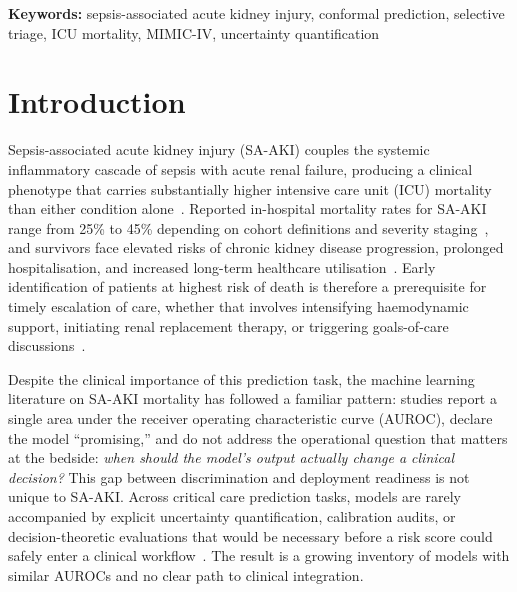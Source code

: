 \documentclass[11pt]{article}
\begin{document}
\medskip
\noindent\textbf{Keywords:}
sepsis-associated acute kidney injury, conformal prediction, selective triage,
ICU mortality, MIMIC-IV, uncertainty quantification


\section{Introduction}\label{sec:introduction}

Sepsis-associated acute kidney injury (SA-AKI) couples the systemic inflammatory
cascade of sepsis with acute renal failure, producing a clinical phenotype that
carries substantially higher intensive care unit (ICU) mortality than either
condition alone~\citep{Poston2019,Kellum2021}.  Reported in-hospital mortality
rates for SA-AKI range from 25\% to 45\% depending on cohort definitions and
severity staging~\citep{Hoste2015,Bagshaw2007}, and survivors face elevated risks
of chronic kidney disease progression, prolonged hospitalisation, and increased
long-term healthcare utilisation~\citep{See2019}.  Early identification of
patients at highest risk of death is therefore a prerequisite for timely
escalation of care, whether that involves intensifying haemodynamic support,
initiating renal replacement therapy, or triggering goals-of-care
discussions~\citep{Zarbock2023}.

Despite the clinical importance of this prediction task, the machine learning
literature on SA-AKI mortality has followed a familiar pattern: studies report a
single area under the receiver operating characteristic curve (AUROC), declare
the model ``promising,'' and do not address the operational question
that matters at the bedside: \emph{when should the model's output actually
change a clinical decision?}  This gap between discrimination and deployment
readiness is not unique to SA-AKI.  Across critical care prediction tasks,
models are rarely accompanied by explicit uncertainty quantification, calibration
audits, or decision-theoretic evaluations that would be necessary before a risk
score could safely enter a clinical workflow~\citep{VanCalster2019,Steyerberg2010}.
The result is a growing inventory of models with similar AUROCs and no clear path
to clinical integration.
\end{document}
